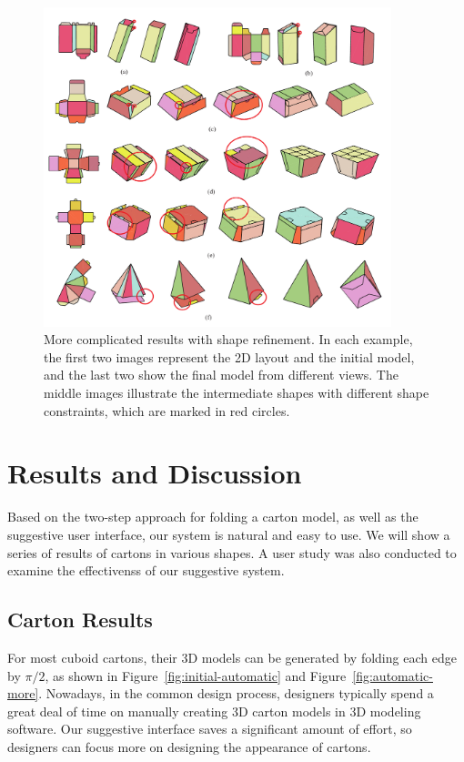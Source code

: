 \begin{figure}[h]
	\centering
	\includegraphics[width=0.9\textwidth]{images/newMore}
	\caption{More complicated results with shape refinement. In each example, the first two images represent the 2D layout and the initial model, and the last two show the final model from different views. The middle images illustrate the intermediate shapes with different shape constraints, which are marked in red circles.}
	\label{fig:result-more}
\end{figure}


\section{Results and Discussion}\label{sec:result}


Based on the two-step approach for folding a carton model, as well as the suggestive user interface, our system is natural and easy to use. 
%
We will show a series of results of cartons in various shapes. 
%
A user study was also conducted to examine the effectivenss of our suggestive system.


\subsection{Carton Results}


For most cuboid cartons, their 3D models can be generated by folding each edge by $\pi/2$, as shown in Figure~\ref{fig:initial-automatic} and Figure~\ref{fig:automatic-more}.
%
Nowadays, in the common design process, designers typically spend a great deal of time on manually creating 3D carton models in 3D modeling software. 
Our suggestive interface saves a significant amount of effort, so designers can focus more on designing the appearance of cartons. 


